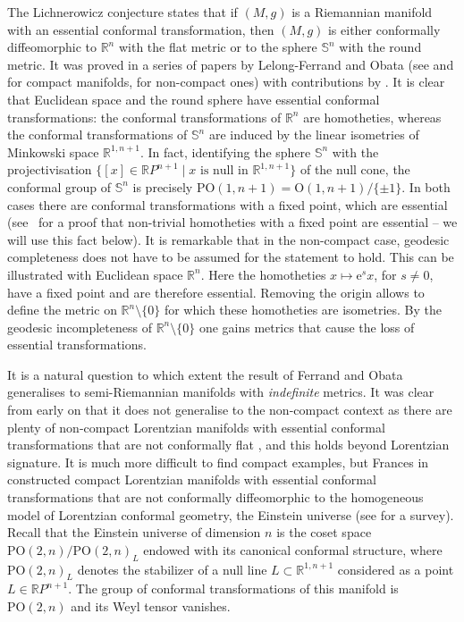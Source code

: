 \documentclass[pdftex]{sigma}
\numberwithin{equation}{section}
\renewcommand{\O}{\ensuremath{\mathrm{O}}}
\renewcommand{\SS}{\ensuremath{\mathbb{S}}}
\newcommand{\1}{\mathbf{1}}
\newcommand{\e}{\mathrm{e}}
\newcommand{\+}{\oplus}
\renewcommand{\=}{\equiv}
\newcommand{\R}{\mathbb{R}}
\begin{document}
The Lichnerowicz conjecture states that if $(M,g)$ is a Riemannian manifold with an essential conformal transformation, then $(M,g)$ is either conformally diffeomorphic to $\R^n$ with the flat metric or to the sphere $\SS^n$ with the round metric. It was proved in a series of papers by Lelong-Ferrand and Obata (see \cite{Lelong-Ferrand71} and \cite{Obata71} for compact manifolds, \cite{Ferrand96} for non-compact ones) with contributions by \cite{Alekseevskii72}. It is clear that Euclidean space and the round sphere have essential conformal transformations: the conformal transformations of $\R^n$ are homotheties, whereas the conformal transformations of $\SS^n$ are induced by the linear isometries of Minkowski space $\R^{1,n+1}$. In fact, identifying the sphere $\SS^n$ with the projectivisation $\bigl\{ [x] \in \mathbb{R}P^{n+1} \mid x \text{ is null in }\R^{1,n+1}\bigr\}$ of the null cone, the conformal group of $\SS^n$ is precisely
$\mathrm{PO}(1,n+1)=\O(1,n+1)/\{\pm 1\}$. In both cases there are conformal transformations with a fixed point, which are essential (see~\mbox{\cite[Proposition~2.5]{LeistnerTeisseire22}} for a proof that non-trivial homotheties with a fixed point are essential -- we will use this fact below).
 It is remarkable that in the non-compact case, geodesic completeness does not have to be assumed for the statement to hold. This can be illustrated with Euclidean space $\R^n$. Here the homotheties $x\mapsto\e^s x$, for $s\not=0$, have a fixed point and are therefore essential. Removing the origin allows to define the metric  on $\R^n\setminus\{0\}$ for which these homotheties are isometries. By the geodesic incompleteness of $\R^n\setminus\{0\}$ one gains metrics that cause the loss of essential transformations.

 It is a natural question to which extent the result of Ferrand and Obata generalises to semi-Riemannian manifolds with {\em indefinite} metrics. It was clear from early on that it does not generalise to the non-compact context as there are plenty of non-compact Lorentzian manifolds with essential conformal transformations that are not conformally flat \cite{Alekseevski85,Podoksenov89,Podoksenov92}, and this holds beyond Lorentzian signature. It is much more difficult to find compact examples, but Frances in \cite{frances05} constructed compact Lorentzian manifolds with essential conformal transformations that are not conformally diffeomorphic to the homogeneous model of Lorentzian conformal geometry, the Einstein universe (see \cite{Frances08} for a survey). Recall that
 the Einstein universe of dimension $n$ is the coset space $\mathrm{PO}(2,n)/\mathrm{PO}(2,n)_L$ endowed with its canonical conformal structure, where $\mathrm{PO}(2,n)_L$ denotes the
 stabilizer of a null line $L\subset \R^{1,n+1}$ considered as a point $L\in \R P^{n+1}$. The group of conformal transformations
 of this manifold is $\mathrm{PO}(2,n)$ and its Weyl tensor vanishes.
\end{document}
